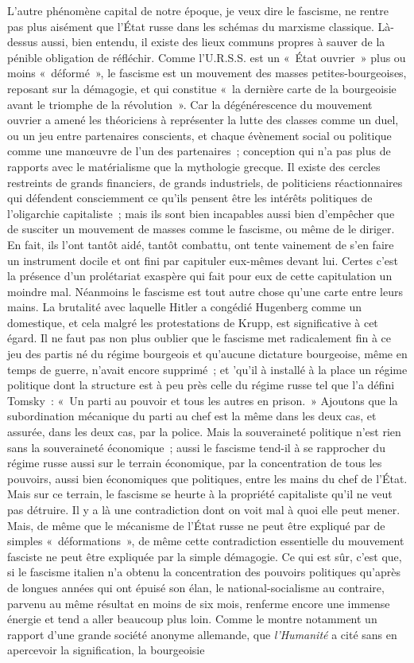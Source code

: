 \documentclass[french,twoside]{book} %
\begin{document}
L'autre phénomène capital de notre époque, je veux dire le fascisme, ne rentre pas plus aisément que l'État russe dans les schémas du marxisme classique. Là-dessus aussi, bien entendu, il existe des lieux communs propres à sauver de la pénible obligation de réfléchir. Comme l'U.R.S.S. est un « État ouvrier » plus ou moins « déformé », le fascisme est un mouvement des masses petites-bourgeoises, reposant sur la démagogie, et qui constitue « la dernière carte de la bourgeoisie avant le triomphe de la révolution ». Car la dégénérescence du mouvement ouvrier a amené les théoriciens à représenter la lutte des classes comme un duel, ou un jeu entre partenaires conscients, et chaque évènement social ou politique comme une manœuvre de l'un des partenaires ; conception qui n'a pas plus de rapports avec le matérialisme que la mythologie grecque. Il existe des cercles restreints de grands financiers, de grands industriels, de politiciens réactionnaires qui défendent consciemment ce qu'ils pensent être les intérêts politiques de l'oligarchie capitaliste ; mais ils sont bien incapables aussi bien d'empêcher que de susciter un mouvement de masses comme le fascisme, ou même de le diriger. En fait, ils l'ont tantôt aidé, tantôt combattu, ont tente vainement de s'en faire un instrument docile et ont fini par capituler eux-mêmes devant lui. Certes c'est la présence d'un prolétariat exaspère qui fait pour eux de cette capitulation un moindre mal. Néanmoins le fascisme est tout autre chose qu'une carte entre leurs mains. La brutalité avec laquelle Hitler a congédié Hugenberg comme un domestique, et cela malgré les protestations de Krupp, est significative à cet égard. Il ne faut pas non plus oublier que le fascisme met radicalement fin à ce jeu des partis né du régime bourgeois et qu'aucune dictature bourgeoise, même en temps de guerre, n'avait encore supprimé ; et 'qu'il à installé à la place un régime politique dont la structure est à peu près celle du régime russe tel que l'a défini Tomsky : « Un parti au pouvoir et tous les autres en prison. » Ajoutons que la subordination mécanique du parti au chef est la même dans les deux cas, et assurée, dans les deux cas, par la police. Mais la souveraineté politique n'est rien sans la souveraineté économique ; aussi le fascisme tend-il à se rapprocher du régime russe aussi sur le terrain économique, par la concentration de tous les pouvoirs, aussi bien économiques que politiques, entre les mains du chef de l'État. Mais sur ce terrain, le fascisme se heurte à la propriété capitaliste qu'il ne veut pas détruire. Il y a là une contradiction dont on voit mal à quoi elle peut mener. Mais, de même que le mécanisme de l'État russe ne peut être expliqué par de simples « déformations », de même cette contradiction essentielle du mouvement fasciste ne peut être expliquée par la simple démagogie. Ce qui est sûr, c'est que, si le fascisme italien n'a obtenu la concentration des pouvoirs politiques qu'après de longues années qui ont épuisé son élan, le national-socialisme au contraire, parvenu au même résultat en moins de six mois, renferme encore une immense énergie et tend a aller beaucoup plus loin. Comme le montre notamment un rapport d'une grande société anonyme allemande, que {\itshape l'Humanité} a cité sans en apercevoir la signification, la bourgeoisie 
\end{document}
